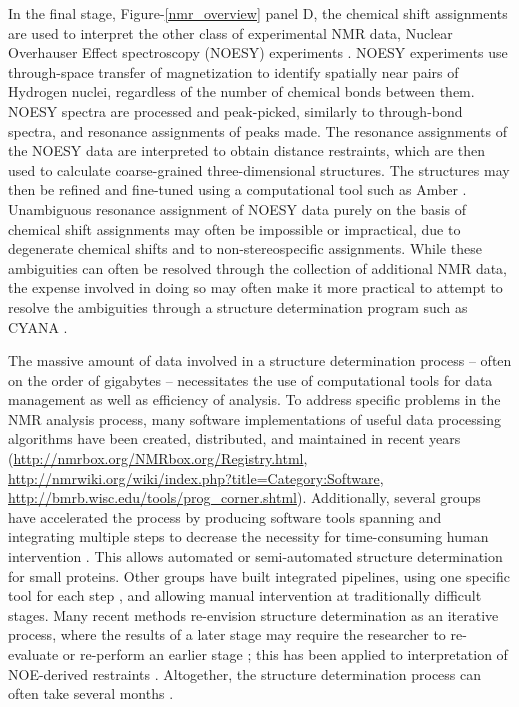 In the final stage, Figure-\ref{nmr_overview} panel D,
the chemical shift assignments are used to 
interpret the other class of experimental NMR data, Nuclear Overhauser Effect 
spectroscopy (NOESY) experiments \cite{noe_kaiser}.  
NOESY experiments use through-space 
transfer of magnetization to identify spatially near pairs of Hydrogen nuclei, 
regardless of the number of chemical bonds between them.  NOESY spectra are 
processed and peak-picked, similarly to through-bond spectra, and resonance 
assignments of peaks made.  The resonance assignments of the NOESY data are 
interpreted to obtain distance restraints, which are then used to calculate 
coarse-grained three-dimensional structures.  The structures may then be 
refined and fine-tuned using a computational tool such as Amber \cite{amber}.  
Unambiguous resonance assignment of NOESY data purely on the basis of chemical 
shift assignments may often be impossible or impractical, due to degenerate 
chemical shifts and to non-stereospecific assignments.  While these 
ambiguities can often be resolved through the collection of additional 
NMR data, the expense involved in doing so may often make it more practical 
to attempt to resolve the ambiguities through a structure determination 
program such as CYANA \cite{cyana2004}.

The massive amount of data involved in a structure determination process --
often on the order of gigabytes -- necessitates the use of computational
tools for data management as well as efficiency of analysis.  To address
specific problems in the NMR analysis process, many software implementations 
of useful data processing algorithms have been created, distributed, and 
maintained in recent years 
(\url{http://nmrbox.org/NMRbox.org/Registry.html}, 
\url{http://nmrwiki.org/wiki/index.php?title=Category:Software}, 
\url{http://bmrb.wisc.edu/tools/prog\_corner.shtml}).  
Additionally, several groups have 
accelerated the process by producing software tools spanning and integrating 
multiple steps to decrease the necessity for time-consuming human intervention
\cite{abacus_assignment}.
This allows automated or semi-automated structure determination for small 
proteins.  Other groups have built integrated pipelines, using one specific 
tool for each step \cite{baran2004automated, sail_flya}, 
and allowing manual intervention at traditionally 
difficult stages.  Many recent methods re-envision structure determination 
as an iterative process, where the results of a later stage may require the 
researcher to re-evaluate or re-perform an earlier stage \cite{cyana2004}; 
this has been applied to interpretation of NOE-derived 
restraints \cite{aria2003}.  Altogether, the structure determination 
process can often take several months \cite{guerry2011automated}.

